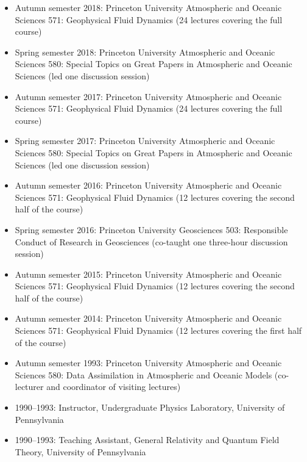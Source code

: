 \documentclass{article}
\begin{document}
\begin{itemize}[leftmargin=*]

\item Autumn semester 2018: Princeton University Atmospheric and Oceanic Sciences 571: Geophysical Fluid Dynamics (24 lectures covering the full course)
    
\item Spring semester 2018: Princeton University Atmospheric and Oceanic Sciences 580: Special Topics on Great Papers in Atmospheric and Oceanic Sciences (led one discussion session)

\item Autumn semester 2017: Princeton University Atmospheric and Oceanic Sciences 571: Geophysical Fluid Dynamics (24 lectures covering the full course)
  
\item Spring semester 2017: Princeton University Atmospheric and Oceanic Sciences 580: Special Topics on Great Papers in Atmospheric and Oceanic Sciences (led one discussion session)

\item Autumn semester 2016: Princeton University Atmospheric and Oceanic Sciences 571: Geophysical Fluid Dynamics (12 lectures covering the second half of the course)

\item Spring semester 2016: Princeton University Geosciences 503: Responsible Conduct of Research in Geosciences (co-taught one three-hour discussion session)

\item Autumn semester 2015: Princeton University Atmospheric and Oceanic Sciences 571: Geophysical Fluid Dynamics (12 lectures covering  the second half of the course)

\item Autumn semester 2014: Princeton University Atmospheric and Oceanic Sciences 571: Geophysical Fluid Dynamics (12 lectures covering  the first half of the course)

\item Autumn semester 1993: Princeton University Atmospheric and Oceanic Sciences 580: Data
  Assimilation in Atmospheric and Oceanic Models (co-lecturer and coordinator of visiting lectures)

\item 1990--1993:  Instructor, Undergraduate Physics Laboratory, University of Pennsylvania 

\item 1990--1993:  Teaching Assistant,  General Relativity and Quantum Field Theory, University of Pennsylvania 

\end{itemize}
\end{document}
